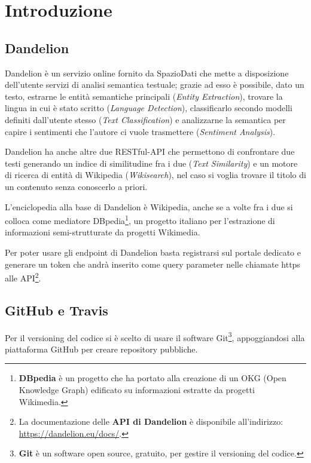 \chapter{Introduzione}
\section{Dandelion}

Dandelion è un servizio online fornito da SpazioDati che mette a disposizione dell'utente servizi di analisi semantica testuale; 
grazie ad esso è possibile, dato un testo, estrarne le entità semantiche principali (\textit{Entity Extraction}\cite{entity-extraction-demo}), trovare la lingua in cui è stato 
scritto (\textit{Language Detection}), classificarlo secondo modelli definiti dall'utente stesso (\textit{Text Classification}\cite{text-classification-demo}) e analizzarne la semantica 
per capire i sentimenti che l'autore ci vuole trasmettere (\textit{Sentiment Analysis}\cite{sentiment-analysis-demo}). 

Dandelion ha anche altre due RESTful-API\cite{rest, api} che permettono di confrontare due testi generando un indice di similitudine fra i due
(\textit{Text Similarity}\cite{text-similarity-demo}) e un motore di ricerca di entità di Wikipedia (\textit{Wikisearch}), nel caso si voglia trovare il titolo 
di un contenuto senza conoscerlo a priori.

L'enciclopedia alla base di Dandelion è Wikipedia, anche se a volte fra i due si colloca come mediatore DBpedia\footnote{
    \textbf{DBpedia}\cite{dbpedia} è un progetto che ha portato alla creazione di un OKG (Open Knowledge Graph) edificato su informazioni estratte da progetti Wikimedia\cite{wikimedia}. 
}, un progetto italiano per l'estrazione di informazioni semi-strutturate da progetti Wikimedia. 

Per poter usare gli endpoint di Dandelion basta registrarsi\cite{dandelion-registration} sul portale dedicato e generare un token che andrà inserito come query parameter nelle 
chiamate https alle API\footnote{
    La documentazione delle \textbf{API di Dandelion} è disponibile all'indirizzo: \href{https://dandelion.eu/docs/}{https://dandelion.eu/docs/}.
}.

\section{GitHub e Travis}
Per il versioning del codice si è scelto di usare il software Git\footnote{
    \textbf{Git}\cite{git} è un software open source, gratuito, per gestire il versioning del codice.
}, appoggiandosi alla piattaforma GitHub per creare repository pubbliche. 

